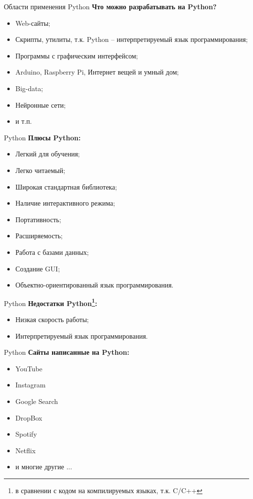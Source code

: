 \documentclass[12pt]{beamer}
\begin{document}
\begin{frame}{Области применения Python}
\textbf{Что можно разрабатывать на Python?}
\vspace{0.5cm}
\begin{itemize}
\item Web-сайты;
\item Скрипты, утилиты, т.к. Python -- интерпретируемый язык программирования;
\item Программы с графическим интерфейсом;
\item Arduino, Raspberry Pi, Интернет вещей и умный дом;
\item Big-data;
\item Нейронные сети;
\item и т.п.
\end{itemize}
\end{frame}

\begin{frame}{Python}
\textbf{Плюсы Python:}
\vspace{0.5cm}
\begin{itemize}
\item Легкий для обучения;
\item Легко читаемый;
\item Широкая стандартная библиотека;
\item Наличие интерактивного режима;
\item Портативность;
\item Расширяемость;
\item Работа с базами данных;
\item Создание GUI;
\item Объектно-ориентированный язык программирования.
\end{itemize}
\end{frame}

\begin{frame}{Python}
\textbf{Недостатки Python\footnote{в сравнении с кодом на компилируемых языках, т.к. C/C++}:}
\vspace{0.5cm}
\begin{itemize}
\item Низкая скорость работы;
\item Интерпретируемый язык программирования.
\end{itemize}
\end{frame}

\begin{frame}{Python}
\textbf{Сайты написанные на Python:}
\vspace{0.5cm}
\begin{itemize}
\item YouTube
\item Instagram
\item Google Search
\item DropBox
\item Spotify
\item Netflix
\item и многие другие ...
\end{itemize}
\end{frame}
\end{document}
